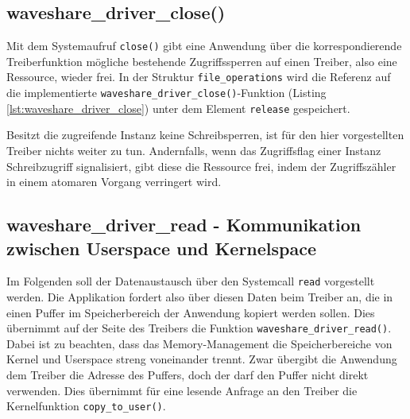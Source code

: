 \subsection{waveshare\_driver\_close()}
Mit dem Systemaufruf \texttt{close()} gibt eine Anwendung über die korrespondierende Treiberfunktion mögliche bestehende Zugriffssperren auf einen Treiber, also eine Ressource, wieder frei. In der Struktur \texttt{file\_operations} wird die Referenz auf die implementierte \texttt{waveshare_driver_close()}-Funktion (Listing \ref{lst:waveshare_driver_close}) unter dem Element \texttt{release} gespeichert. 

Besitzt die zugreifende Instanz keine Schreibsperren, ist für den hier vorgestellten Treiber nichts weiter zu tun. Andernfalls, wenn das Zugriffsflag einer Instanz Schreibzugriff signalisiert, gibt diese die Ressource frei, indem der Zugriffszähler in einem atomaren Vorgang verringert wird. 




\subsection{waveshare\_driver\_read - Kommunikation zwischen Userspace und Kernelspace} %
Im Folgenden soll der Datenaustausch über den Systemcall \texttt{read} vorgestellt werden. Die Applikation fordert also über diesen Daten beim Treiber an, die in einen Puffer im Speicherbereich der Anwendung kopiert werden sollen. Dies übernimmt auf der Seite des Treibers die Funktion \texttt{waveshare_driver_read()}. Dabei ist zu beachten, dass das Memory-Management die Speicherbereiche von Kernel und Userspace streng voneinander trennt. Zwar übergibt die Anwendung dem Treiber die Adresse des Puffers, doch der darf den Puffer nicht direkt verwenden. Dies übernimmt für eine lesende Anfrage an den Treiber die Kernelfunktion \texttt{copy_to_user()}. 


